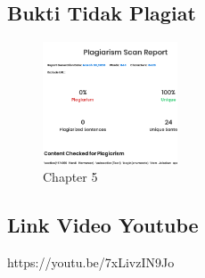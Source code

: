 \subsection{Bukti Tidak Plagiat}
\begin{figure}[H]
\centering
	\includegraphics[width=4cm]{figures/1174080/5/plagiat.PNG}
	\caption{Chapter 5}
\end{figure}

\subsection{Link Video Youtube}
https://youtu.be/7xLivzIN9Jo